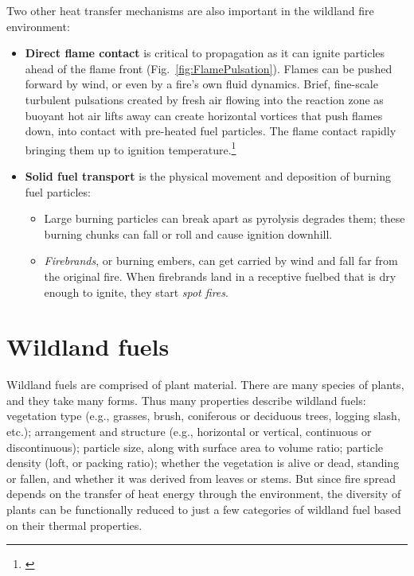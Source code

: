 Two other heat transfer mechanisms are also important in the wildland fire environment:

\begin{itemize}
	\item \textbf{Direct flame contact} is critical to propagation as it can ignite particles ahead of the flame front (Fig.~\ref{fig:FlamePulsation}). Flames can be pushed forward by wind, or even by a fire's own fluid dynamics. 
	Brief, fine-scale turbulent pulsations created by fresh air flowing into the reaction zone as buoyant hot air lifts away can create horizontal vortices that push flames down, into contact with pre-heated fuel particles. The flame contact rapidly bringing them up to ignition temperature.\footnote{\citet{finney2015, tang2017, morandini2018}} 
	\item \textbf{Solid fuel transport} is the physical movement and deposition of burning fuel particles: 
	\begin{itemize}
		\item Large burning particles can break apart as pyrolysis degrades them; these burning chunks can fall or roll and cause ignition downhill.
		\item \emph{Firebrands}, or burning embers, can get carried by wind and fall far from the original fire. When firebrands land in a receptive fuelbed that is dry enough to ignite, they start \emph{spot fires}.
	\end{itemize}
\end{itemize}

\section{Wildland fuels} 

Wildland fuels are comprised of plant material. 
There are many species of plants, and they take many forms. 
Thus many properties describe wildland fuels: vegetation type (e.g., grasses, brush, coniferous or deciduous trees, logging slash, etc.); arrangement and structure (e.g., horizontal or vertical, continuous or discontinuous); particle size, along with surface area to volume ratio; particle density (loft, or packing ratio); whether the vegetation is alive or dead, standing or fallen, and whether it was derived from leaves or stems. 
But since fire spread depends on the transfer of heat energy through the environment, the diversity of plants can be functionally reduced to just a few categories of wildland fuel based on their thermal properties. 

